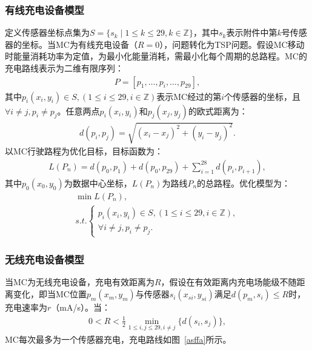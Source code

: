 \documentclass{whutmod}
\begin{document}
            \subsubsection{有线充电设备模型}
                定义传感器坐标点集为$S=\{s_k \mid 1 \leqslant k \leqslant 29, k \in \mathbb{Z}\}$，其中$s_k$表示附件中第$k$号传感器的坐标。当MC为有线充电设备（$R=0$），问题转化为TSP问题。假设MC移动时能量消耗功率为定值，为最小化能量消耗，需最小化每个周期的总路程。MC的充电路线表示为二维有限序列：
                \begin{gather}
                    P = [p_1, \dots, p_i, \dots, p_{29}],
                \end{gather}
                其中$p_i(x_i, y_i) \in S, (1 \leqslant i \leqslant 29, i \in \mathbb{Z})$表示MC经过的第$i$个传感器的坐标，且$\forall i \neq j, p_i \neq p_j$。任意两点$p_i(x_i, y_i)$和$p_j(x_j, y_j)$的欧式距离为：
                \begin{gather*}
                    d(p_i, p_j) = \sqrt{(x_i - x_j)^2 + (y_i - y_j)^2}.
                \end{gather*}
                以MC行驶路程为优化目标，目标函数为：
                \begin{gather*}
                    L(P_n) = d(p_0, p_1) + d(p_0, p_{29}) + \sum_{i=1}^{28} d(p_i, p_{i+1}),
                \end{gather*}
                其中$p_0(x_0, y_0)$为数据中心坐标，$L(P_n)$为路线$P_n$的总路程。优化模型为：
                \begin{gather}
                    \min L(P_n), \\
                    s.t. \left\{
                    \begin{matrix}
                        p_i(x_i, y_i) \in S, (1 \leqslant i \leqslant 29, i \in \mathbb{Z}), \\
                        \forall i \neq j, p_i \neq p_j.
                    \end{matrix}
                    \right.
                \end{gather}

            \subsubsection{无线充电设备模型}
                当MC为无线充电设备，充电有效距离为$R$，假设在有效距离内充电场能级不随距离变化，即当MC位置$p_m(x_m, y_m)$与传感器$s_i(x_{si}, y_{si})$满足$d(p_m, s_i) \leqslant R$时，充电速率为$r$（mA/s）。当：
                \begin{gather}
                    0 < R < \frac{1}{2} \min_{1 \leqslant i, j \leqslant 29, i \neq j} \{ d(s_i, s_j) \},
                \end{gather}
                MC每次最多为一个传感器充电，充电路线如图~\ref{asffa}所示。
\end{document}
